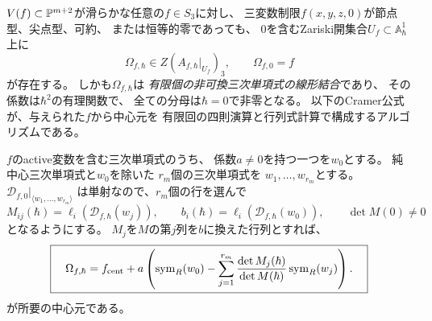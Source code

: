 \begin{theorem}[全滑らかな三次ブロックに対する普遍Cramer中心元]
\label{thm:pg-universal-determinant}
$V(f)\subset\mathbb P^{m+2}$が滑らかな任意の$f\in S_3$に対し、
三変数制限$f(x,y,z,0)$が節点型、尖点型、可約、
または恒等的零であっても、
$0$を含むZariski開集合$U_f\subset\mathbb A^1_\hbar$上に
\begin{equation}
 \boxed{\quad
 \Omega_{f,\hbar}\in
 Z\!\left(A_{f,\hbar}|_{U_f}\right)_3,\qquad
 \Omega_{f,0}=f
 \quad}
 \label{eq:pg-det-all-centers}
\end{equation}
が存在する。
しかも$\Omega_{f,\hbar}$は
\emph{有限個の非可換三次単項式の線形結合}であり、
その係数は$\hbar^2$の有理関数で、
全ての分母は$\hbar=0$で非零となる。
以下のCramer公式が、与えられた$f$から中心元を
有限回の四則演算と行列式計算で構成するアルゴリズムである。

$f$のactive変数を含む三次単項式のうち、
係数$a\ne0$を持つ一つを$w_0$とする。
純中心三次単項式と$w_0$を除いた
$r_m$個の三次単項式を
$w_1,\ldots,w_{r_m}$とする。
$\mathcal D_{f,0}|_{\langle w_1,\ldots,w_{r_m}\rangle}$
は単射なので、$r_m$個の行を選んで
\begin{equation}
 M_{ij}(\hbar)=\ell_i(\mathcal D_{f,\hbar}(w_j)),
 \qquad
 b_i(\hbar)=\ell_i(\mathcal D_{f,\hbar}(w_0)),
 \qquad
 \det M(0)\ne0
 \label{eq:pg-det-minor}
\end{equation}
となるようにする。
$M_j$を$M$の第$j$列を$b$に換えた行列とすれば、
\begin{equation}
 \boxed{\quad
 \Omega_{f,\hbar}
 =f_{\mathrm{cent}}+
 a\left(
 \operatorname{sym}_R(w_0)-\sum_{j=1}^{r_m}
 \frac{\det M_j(\hbar)}{\det M(\hbar)}\operatorname{sym}_R(w_j)
 \right).
 \quad}
 \label{eq:pg-det-universal-center}
\end{equation}
が所要の中心元である。
\end{theorem}
